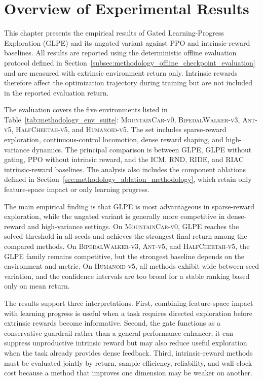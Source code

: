 \section{Overview of Experimental Results}
\label{sec:results_overview}

This chapter presents the empirical results of Gated Learning-Progress Exploration (GLPE) and its ungated variant against PPO and intrinsic-reward baselines.
All results are reported using the deterministic offline evaluation protocol defined in Section~\ref{subsec:methodology_offline_checkpoint_evaluation} and are measured with extrinsic environment return only.
Intrinsic rewards therefore affect the optimization trajectory during training but are not included in the reported evaluation return.

The evaluation covers the five environments listed in Table~\ref{tab:methodology_env_suite}: \textsc{MountainCar-v0}, \textsc{BipedalWalker-v3}, \textsc{Ant-v5}, \textsc{HalfCheetah-v5}, and \textsc{Humanoid-v5}.
The set includes sparse-reward exploration, continuous-control locomotion, dense reward shaping, and high-variance dynamics.
The principal comparison is between GLPE, GLPE without gating, PPO without intrinsic reward, and the ICM, RND, RIDE, and RIAC intrinsic-reward baselines.
The analysis also includes the component ablations defined in Section~\ref{sec:methodology_ablation_methodology}, which retain only feature-space impact or only learning progress.

The main empirical finding is that GLPE is most advantageous in sparse-reward exploration, while the ungated variant is generally more competitive in dense-reward and high-variance settings.
On \textsc{MountainCar-v0}, GLPE reaches the solved threshold in all seeds and achieves the strongest final return among the compared methods.
On \textsc{BipedalWalker-v3}, \textsc{Ant-v5}, and \textsc{HalfCheetah-v5}, the GLPE family remains competitive, but the strongest baseline depends on the environment and metric.
On \textsc{Humanoid-v5}, all methods exhibit wide between-seed variation, and the confidence intervals are too broad for a stable ranking based only on mean return.

The results support three interpretations.
First, combining feature-space impact with learning progress is useful when a task requires directed exploration before extrinsic rewards become informative.
Second, the gate functions as a conservative guardrail rather than a general performance enhancer; it can suppress unproductive intrinsic reward but may also reduce useful exploration when the task already provides dense feedback.
Third, intrinsic-reward methods must be evaluated jointly by return, sample efficiency, reliability, and wall-clock cost because a method that improves one dimension may be weaker on another.